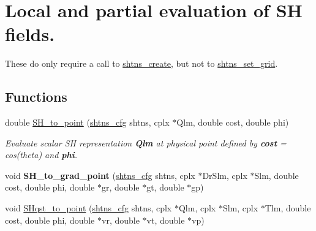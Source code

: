 \hypertarget{group__local}{}\section{Local and partial evaluation of S\+H fields.}
\label{group__local}


These do only require a call to \hyperlink{group__init_ga54b088013246e361b3c7387ac17bf9c1}{shtns\+\_\+create}, but not to \hyperlink{group__init_ga504eedd43b90d435fc55f7e22e18c44e}{shtns\+\_\+set\+\_\+grid}.  


\subsection*{Functions}
\begin{DoxyCompactItemize}
\item 
\hypertarget{group__local_gabf09188eb9c6351807752e160b4c1723}{}double \hyperlink{group__local_gabf09188eb9c6351807752e160b4c1723}{S\+H\+\_\+to\+\_\+point} (\hyperlink{shtns_8h_ab7bd78e5cbeb4ed18782d018195fde00}{shtns\+\_\+cfg} shtns, cplx $\ast$Qlm, double cost, double phi)\label{group__local_gabf09188eb9c6351807752e160b4c1723}

\begin{DoxyCompactList}\small\item\em Evaluate scalar S\+H representation {\bfseries Qlm} at physical point defined by {\bfseries cost} = cos(theta) and {\bfseries phi}. \end{DoxyCompactList}\item 
\hypertarget{group__local_gae6c36bc728d73f6e7b8a212bed4d34c3}{}void {\bfseries S\+H\+\_\+to\+\_\+grad\+\_\+point} (\hyperlink{shtns_8h_ab7bd78e5cbeb4ed18782d018195fde00}{shtns\+\_\+cfg} shtns, cplx $\ast$Dr\+Slm, cplx $\ast$Slm, double cost, double phi, double $\ast$gr, double $\ast$gt, double $\ast$gp)\label{group__local_gae6c36bc728d73f6e7b8a212bed4d34c3}

\item 
\hypertarget{group__local_ga10e38e735afa642698c4c78fda56b045}{}void \hyperlink{group__local_ga10e38e735afa642698c4c78fda56b045}{S\+Hqst\+\_\+to\+\_\+point} (\hyperlink{shtns_8h_ab7bd78e5cbeb4ed18782d018195fde00}{shtns\+\_\+cfg} shtns, cplx $\ast$Qlm, cplx $\ast$Slm, cplx $\ast$Tlm, double cost, double phi, double $\ast$vr, double $\ast$vt, double $\ast$vp)\label{group__local_ga10e38e735afa642698c4c78fda56b045}


\end{DoxyCompactItemize}
